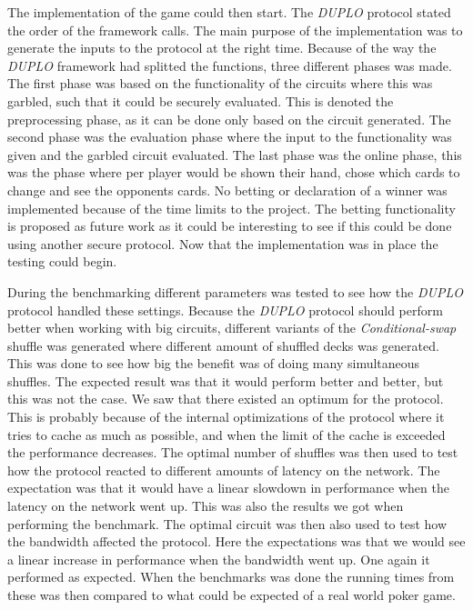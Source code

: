 \documentclass[twoside,11pt,openright]{report}
\newcommand{\CS}{\textit{Conditional-swap} }
\newcommand{\DUPLO}{\textit{DUPLO} }
\begin{document}
The implementation of the game could then start. The \DUPLO protocol stated the order of the framework calls. The main purpose of the implementation was to generate the inputs to the protocol at the right time. Because of the way the \DUPLO framework had splitted the functions, three different phases was made. The first phase was based on the functionality of the circuits where this was garbled, such that it could be securely evaluated. This is denoted the preprocessing phase, as it can be done only based on the circuit generated. The second phase was the evaluation phase where the input to the functionality was given and the garbled circuit evaluated. The last phase was the online phase, this was the phase where per player would be shown their hand, chose which cards to change and see the opponents cards. No betting or declaration of a winner was implemented because of the time limits to the project. The betting functionality is proposed as future work as it could be interesting to see if this could be done using another secure protocol. Now that the implementation was in place the testing could begin.

During the benchmarking different parameters was tested to see how the \DUPLO protocol handled these settings. Because the \DUPLO protocol should perform better when working with big circuits, different variants of the \CS shuffle was generated where different amount of shuffled decks was generated. This was done to see how big the benefit was of doing many simultaneous shuffles. The expected result was that it would perform better and better, but this was not the case. We saw that there existed an optimum for the protocol. This is probably because of the internal optimizations of the protocol where it tries to cache as much as possible, and when the limit of the cache is exceeded the performance decreases. The optimal number of shuffles was then used to test how the protocol reacted to different amounts of latency on the network. The expectation was that it would have a linear slowdown in performance when the latency on the network went up. This was also the results we got when performing the benchmark. The optimal circuit was then also used to test how the bandwidth affected the protocol. Here the expectations was that we would see a linear increase in performance when the bandwidth went up. One again it performed as expected. When the benchmarks was done the running times from these was then compared to what could be expected of a real world poker game.
\end{document}
